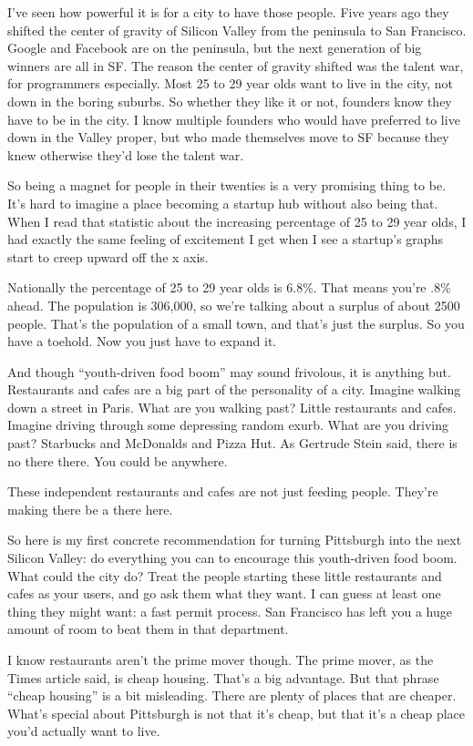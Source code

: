 I've seen how powerful it is for a city to have those people. Five years
ago they shifted the center of gravity of Silicon Valley from the
peninsula to San Francisco. Google and Facebook are on the peninsula,
but the next generation of big winners are all in SF. The reason the
center of gravity shifted was the talent war, for programmers
especially. Most 25 to 29 year olds want to live in the city, not down
in the boring suburbs. So whether they like it or not, founders know
they have to be in the city. I know multiple founders who would have
preferred to live down in the Valley proper, but who made themselves
move to SF because they knew otherwise they'd lose the talent war.

So being a magnet for people in their twenties is a very promising thing
to be. It's hard to imagine a place becoming a startup hub without also
being that. When I read that statistic about the increasing percentage
of 25 to 29 year olds, I had exactly the same feeling of excitement I
get when I see a startup's graphs start to creep upward off the x axis.

Nationally the percentage of 25 to 29 year olds is 6.8\%. That means
you're .8\% ahead. The population is 306,000, so we're talking about a
surplus of about 2500 people. That's the population of a small town, and
that's just the surplus. So you have a toehold. Now you just have to
expand it.

And though ``youth-driven food boom'' may sound frivolous, it is
anything but. Restaurants and cafes are a big part of the personality of
a city. Imagine walking down a street in Paris. What are you walking
past? Little restaurants and cafes. Imagine driving through some
depressing random exurb. What are you driving past? Starbucks and
McDonalds and Pizza Hut. As Gertrude Stein said, there is no there
there. You could be anywhere.

These independent restaurants and cafes are not just feeding people.
They're making there be a there here.

So here is my first concrete recommendation for turning Pittsburgh into
the next Silicon Valley: do everything you can to encourage this
youth-driven food boom. What could the city do? Treat the people
starting these little restaurants and cafes as your users, and go ask
them what they want. I can guess at least one thing they might want: a
fast permit process. San Francisco has left you a huge amount of room to
beat them in that department.

I know restaurants aren't the prime mover though. The prime mover, as
the Times article said, is cheap housing. That's a big advantage. But
that phrase ``cheap housing'' is a bit misleading. There are plenty of
places that are cheaper. What's special about Pittsburgh is not that
it's cheap, but that it's a cheap place you'd actually want to live.

